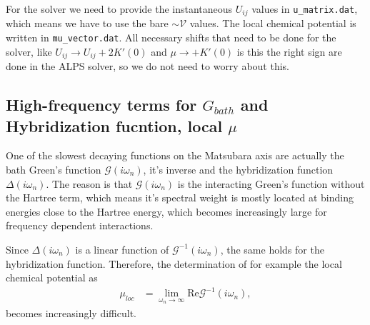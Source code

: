 \documentclass[12pt,a4paper]{scrartcl}
\numberwithin{equation}{section}
\newcommand{\cng}[1]{{\color{red}#1}}
\begin{document}
For the solver we need to provide the instantaneous $U_{ij}$ values in 
\verb|u_matrix.dat|,  which means we have to use the bare 
$\sim\mathcal{V}$ values. The local chemical potential is written
in \verb|mu_vector.dat|. All necessary shifts that need to be done for the solver, like
$U_{ij} \rightarrow U_{ij} + 2K'(0)$ and $\mu\rightarrow + K'(0)$ 
\cng{is this the right sign} are done in the ALPS solver, so we do not
need to worry about this.



\subsection{High-frequency terms for $G_{bath}$ and Hybridization fucntion, local $\mu$}
One of the slowest decaying functions on the Matsubara axis
are actually the bath Green's function $\mathscr{G}(i\omega_n)$, it's inverse
and the hybridization function $\Delta(i\omega_n)$.
The reason is that $\mathscr{G}(i\omega_n)$ is the interacting
Green's function without the Hartree term, which means it's spectral weight
is mostly located at binding energies close to the Hartree energy, which
becomes increasingly large for frequency dependent interactions.

Since $\Delta(i\omega_n)$ is a linear function of $\mathscr{G}^{-1}(i\omega_n)$,
the same holds for the hybridization function.
Therefore,
the determination of for example the local chemical potential as
\begin{align}
 \mu_{loc} 
 &= \lim_{\omega_n\rightarrow \infty} \mathrm{Re}\mathscr{G}^{-1}(i\omega_n),
\end{align}
becomes increasingly difficult.
\end{document}
